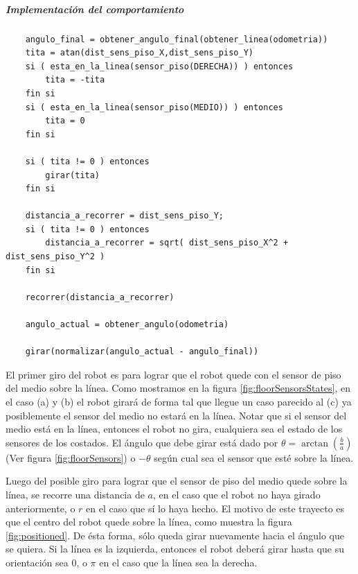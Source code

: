 \subparagraph{Implementaci\'on del comportamiento}
\begin{verbatim}
    angulo_final = obtener_angulo_final(obtener_linea(odometria))
    tita = atan(dist_sens_piso_X,dist_sens_piso_Y)
    si ( esta_en_la_linea(sensor_piso(DERECHA)) ) entonces
        tita = -tita
    fin si
    si ( esta_en_la_linea(sensor_piso(MEDIO)) ) entonces
        tita = 0
    fin si

    si ( tita != 0 ) entonces
        girar(tita)
    fin si

    distancia_a_recorrer = dist_sens_piso_Y;
    si ( tita != 0 ) entonces
        distancia_a_recorrer = sqrt( dist_sens_piso_X^2 + dist_sens_piso_Y^2 )
    fin si

    recorrer(distancia_a_recorrer)

    angulo_actual = obtener_angulo(odometria)

    girar(normalizar(angulo_actual - angulo_final))
\end{verbatim}

El primer giro del robot es para lograr que el robot quede con el sensor de piso del medio
sobre la l\'inea. Como mostramos en la figura \ref{fig:floorSensorsStates}, en el caso (a) y (b)
el robot girar\'a de forma tal que llegue un caso parecido al (c) ya posiblemente el sensor del
medio no estar\'a en la l\'inea. Notar que si el sensor del medio est\'a en
la l\'inea, entonces el robot no gira, cualquiera sea el estado de los sensores de los costados.
El \'angulo que debe girar est\'a dado por $\theta = \arctan (\frac{b}{a})$ (Ver figura
\ref{fig:floorSensors}) o $-\theta$ seg\'un cual sea el sensor que est\'e sobre la l\'inea.

Luego del posible giro para lograr que el sensor de piso del medio quede sobre la l\'inea, 
se recorre una distancia de $a$, en el caso que el robot no haya girado anteriormente, o $r$ en
el caso que s\'i lo haya hecho. El motivo de este trayecto es que el centro del robot quede
sobre la l\'inea, como muestra la figura \ref{fig:positioned}. De \'esta forma, s\'olo queda
girar nuevamente hacia el \'angulo que se quiera. Si la l\'inea es la izquierda, entonces el
robot deber\'a girar hasta que su orientaci\'on sea $0$, o $\pi$ en el caso que la l\'inea
sea la derecha.

